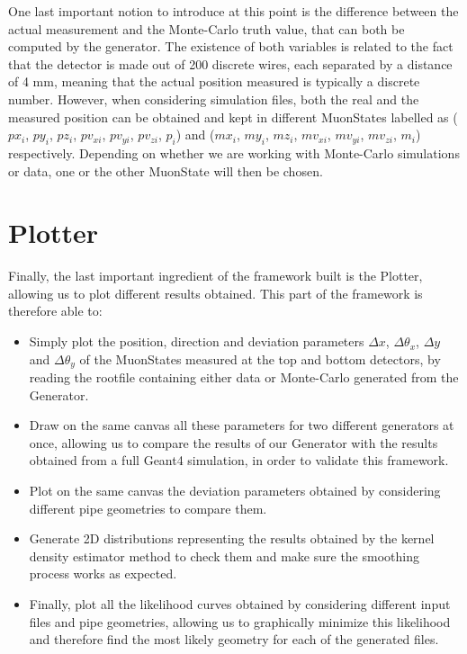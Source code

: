 \documentclass[a4paper, 11pt]{report}
\begin{document}
One last important notion to introduce at this point is the difference between the actual measurement and the Monte-Carlo truth value, that can both be computed by the generator. The existence of both variables is related to the fact that the detector is made out of 200 discrete wires, each separated by a distance of 4 mm, meaning that the actual position measured is typically a discrete number. However, when considering simulation files, both the real and the measured position can be obtained and kept in different MuonStates labelled as ($px_i$, $py_i$, $pz_i$, $pv_{xi}$, $pv_{yi}$, $pv_{zi}$, $p_i$) and ($mx_i$, $my_i$, $mz_i$, $mv_{xi}$, $mv_{yi}$, $mv_{zi}$, $m_i$) respectively. Depending on whether we are working with Monte-Carlo simulations or data, one or the other MuonState will then be chosen.

\section{Plotter} \label{sec:Plotter}

Finally, the last important ingredient of the framework built is the Plotter, allowing us to plot different results obtained. This part of the framework is therefore able to:

\begin{itemize}
    \item Simply plot the position, direction and deviation parameters $\Delta x$, $\Delta \theta_x$, $\Delta y$ and $\Delta \theta_y$ of the MuonStates measured at the top and bottom detectors, by reading the rootfile containing either data or Monte-Carlo generated from the Generator.
    \item Draw on the same canvas all these parameters for two different generators at once, allowing us to compare the results of our Generator with the results obtained from a full Geant4 simulation, in order to validate this framework.
    \item Plot on the same canvas the deviation parameters obtained by considering different pipe geometries to compare them.
    \item Generate 2D distributions representing the results obtained by the kernel density estimator method to check them and make sure the smoothing process works as expected.
    \item Finally, plot all the likelihood curves obtained by considering different input files and pipe geometries, allowing us to graphically minimize this likelihood and therefore find the most likely geometry for each of the generated files.
\end{itemize}
\end{document}
